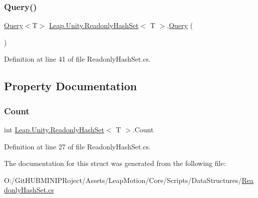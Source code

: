 \mbox{\label{struct_leap_1_1_unity_1_1_readonly_hash_set_a83284baa667b7e1e17703b869947f7df}} 
\subsubsection{\texorpdfstring{Query()}{Query()}}
{\footnotesize\ttfamily \mbox{\hyperlink{struct_leap_1_1_unity_1_1_query_1_1_query}{Query}}$<$T$>$ \mbox{\hyperlink{struct_leap_1_1_unity_1_1_readonly_hash_set}{Leap.\+Unity.\+Readonly\+Hash\+Set}}$<$ T $>$.\mbox{\hyperlink{struct_leap_1_1_unity_1_1_query_1_1_query}{Query}} (\begin{DoxyParamCaption}{ }\end{DoxyParamCaption})}



Definition at line 41 of file Readonly\+Hash\+Set.\+cs.



\subsection{Property Documentation}
\mbox{\label{struct_leap_1_1_unity_1_1_readonly_hash_set_a3b33c3913042d04cc2bef0c7fd8ee919}} 
\subsubsection{\texorpdfstring{Count}{Count}}
{\footnotesize\ttfamily int \mbox{\hyperlink{struct_leap_1_1_unity_1_1_readonly_hash_set}{Leap.\+Unity.\+Readonly\+Hash\+Set}}$<$ T $>$.Count\hspace{0.3cm}{\ttfamily [get]}}



Definition at line 27 of file Readonly\+Hash\+Set.\+cs.



The documentation for this struct was generated from the following file\+:\begin{DoxyCompactItemize}
\item 
O\+:/\+Git\+H\+U\+B\+M\+I\+N\+I\+P\+Roject/\+Assets/\+Leap\+Motion/\+Core/\+Scripts/\+Data\+Structures/\mbox{\hyperlink{_readonly_hash_set_8cs}{Readonly\+Hash\+Set.\+cs}}\end{DoxyCompactItemize}
